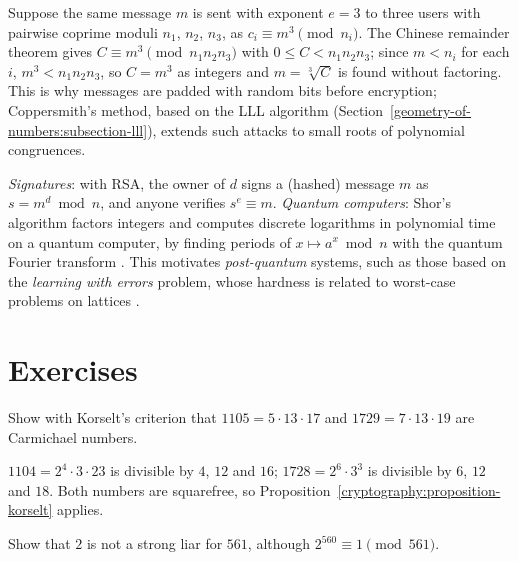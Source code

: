 \begin{example}\label{cryptography:example-hastad}
Suppose the same message $m$ is sent with exponent $e = 3$ to three users with pairwise coprime moduli $n_1$, $n_2$, $n_3$, as $c_i \equiv m^3 \pmod{n_i}$. The Chinese remainder theorem gives
$C \equiv m^3 \pmod{n_1n_2n_3}$ with $0 \leq C < n_1n_2n_3$; since $m < n_i$ for each $i$, $m^3 < n_1n_2n_3$, so $C = m^3$ as integers and $m = \sqrt[3]{C}$ is found without factoring. This is why messages are
padded with random bits before encryption; Coppersmith's method, based on the LLL algorithm (Section~\ref{geometry-of-numbers:subsection-lll}), extends such attacks to small roots of polynomial congruences.
\end{example}

\begin{remark}\label{cryptography:remark-signatures-quantum}
\emph{Signatures}: with RSA, the owner of $d$ signs a (hashed) message $m$ as $s = m^d \bmod n$, and anyone verifies $s^e \equiv m$. \emph{Quantum computers}: Shor's algorithm factors integers and computes
discrete logarithms in polynomial time on a quantum computer, by finding periods of $x \mapsto a^x \bmod n$ with the quantum Fourier transform \cite{shor-1997}. This motivates \emph{post-quantum} systems,
such as those based on the \emph{learning with errors} problem, whose hardness is related to worst-case problems on lattices \cite{regev-2009}.
\end{remark}

\section{Exercises}\label{cryptography:section-exercises}

\begin{exercise}\label{cryptography:exercise-carmichael}
Show with Korselt's criterion that $1105 = 5 \cdot 13 \cdot 17$ and $1729 = 7 \cdot 13 \cdot 19$ are Carmichael numbers.
\end{exercise}

\begin{solution}
$1104 = 2^4 \cdot 3 \cdot 23$ is divisible by $4$, $12$ and $16$; $1728 = 2^6 \cdot 3^3$ is divisible by $6$, $12$ and $18$. Both numbers are squarefree, so Proposition~\ref{cryptography:proposition-korselt} applies.
\end{solution}

\begin{exercise}\label{cryptography:exercise-strong-liar-561}
Show that $2$ is not a strong liar for $561$, although $2^{560} \equiv 1 \pmod{561}$.
\end{exercise}

